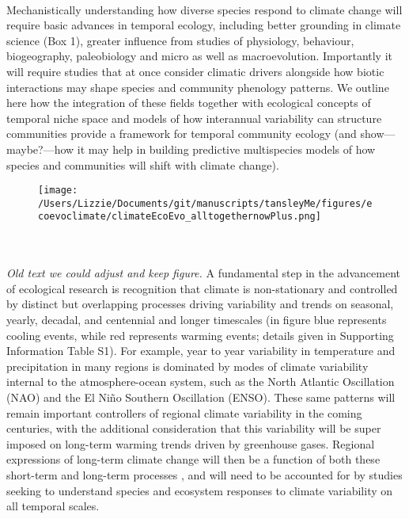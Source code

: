 \documentclass[11pt,a4paper]{article}
\begin{document}
\\
Mechanistically understanding how diverse species respond to climate change will require basic advances in temporal ecology, including better grounding in climate science (Box 1), greater influence from studies of physiology, behaviour, biogeography, paleobiology and micro as well as macroevolution. Importantly it will require studies that at once consider climatic drivers alongside how biotic interactions may shape species and community phenology patterns. We outline here how the integration of these fields together with ecological concepts of temporal niche space and models of how interannual variability can structure communities provide a framework for temporal community ecology (and show---maybe?---how it may help in building predictive multispecies models of how species and communities will shift with climate change).\\
\newpage
\begin{figure}[h!]
\centering
\noindent \texttt{[image: /Users/Lizzie/Documents/git/manuscripts/tansleyMe/figures/ecoevoclimate/climateEcoEvo\_alltogethernowPlus.png]}
\end{figure}
\\
\\
\noindent \emph{Old text we could adjust and keep figure.} A fundamental step in the advancement of ecological research is recognition that climate is non-stationary and controlled by distinct but overlapping processes driving variability and trends on seasonal, yearly, decadal, and centennial and longer timescales (in figure blue represents cooling events, while red represents warming events; details given in Supporting Information Table S1). For example, year to year variability in temperature and precipitation in many regions is dominated by modes of climate variability internal to the atmosphere-ocean system, such as the North Atlantic Oscillation (NAO) and the El Ni\~{n}o Southern Oscillation (ENSO). These same patterns will remain important controllers of regional climate variability in the coming centuries, with the additional consideration that this variability will be super imposed on long-term warming trends driven by greenhouse gases. Regional expressions of long-term climate change will then be a function of both these short-term and long-term processes \citep{deser2012}, and will need to be accounted for by studies seeking to understand species and ecosystem responses to climate variability on all temporal scales. \\
\end{document}
